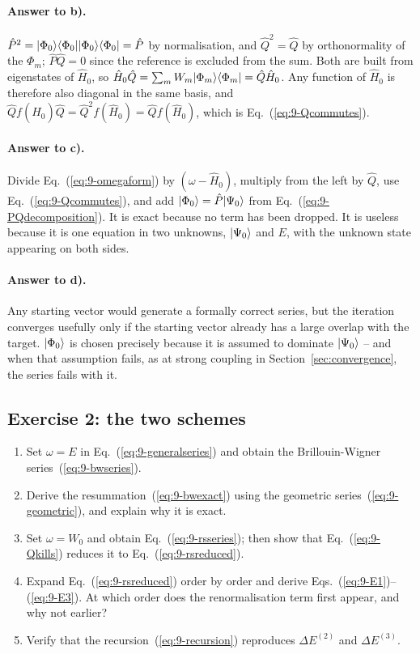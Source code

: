 \paragraph{Answer to b).}
$\hat{P}^2=\vert \Phi_0 \rangle\langle \Phi_0 \vert\vert \Phi_0 \rangle\langle \Phi_0 \vert=\hat{P}$ by
normalisation, and $\hat{Q}^2=\hat{Q}$ by orthonormality of the $\Phi_m$;
$\hat{P}\hat{Q}=0$ since the reference is excluded from the sum.  Both are
built from eigenstates of $\hat{H}_0$, so
$\hat{H}_0\hat{Q}=\sum_m W_m\vert \Phi_m \rangle\langle \Phi_m \vert=\hat{Q}\hat{H}_0$.  Any
function of $\hat{H}_0$ is therefore also diagonal in the same basis, and
$\hat{Q}f(\hat{H}_0)\hat{Q}=\hat{Q}^2f(\hat{H}_0)=\hat{Q}f(\hat{H}_0)$, which
is Eq.~(\ref{eq:9-Qcommutes}).

\paragraph{Answer to c).}
Divide Eq.~(\ref{eq:9-omegaform}) by $(\omega-\hat{H}_0)$, multiply from the
left by $\hat{Q}$, use Eq.~(\ref{eq:9-Qcommutes}), and add
$\vert \Phi_0 \rangle=\hat{P}\vert \Psi_0 \rangle$ from
Eq.~(\ref{eq:9-PQdecomposition}).  It is exact because no term has been
dropped.  It is useless because it is one equation in two unknowns,
$\vert \Psi_0 \rangle$ and $E$, with the unknown state appearing on both sides.

\paragraph{Answer to d).}
Any starting vector would generate a formally correct series, but the
iteration converges usefully only if the starting vector already has a large
overlap with the target.  $\vert \Phi_0 \rangle$ is chosen precisely because it is
assumed to dominate $\vert \Psi_0 \rangle$ -- and when that assumption fails, as at
strong coupling in Section~\ref{sec:convergence}, the series fails with it.

\subsection*{Exercise 2: the two schemes}
\label{ex:9-schemes}

\begin{enumerate}
  \item[a)] Set $\omega=E$ in Eq.~(\ref{eq:9-generalseries}) and obtain the
  Brillouin-Wigner series~(\ref{eq:9-bwseries}).
  \item[b)] Derive the resummation~(\ref{eq:9-bwexact}) using the geometric
  series~(\ref{eq:9-geometric}), and explain why it is exact.
  \item[c)] Set $\omega=W_0$ and obtain Eq.~(\ref{eq:9-rsseries}); then show
  that Eq.~(\ref{eq:9-Qkills}) reduces it to
  Eq.~(\ref{eq:9-rsreduced}).
  \item[d)] Expand Eq.~(\ref{eq:9-rsreduced}) order by order and derive
  Eqs.~(\ref{eq:9-E1})--(\ref{eq:9-E3}).  At which order does the
  renormalisation term first appear, and why not earlier?
  \item[e)] Verify that the recursion~(\ref{eq:9-recursion}) reproduces
  $\Delta E^{(2)}$ and $\Delta E^{(3)}$.
\end{enumerate}

